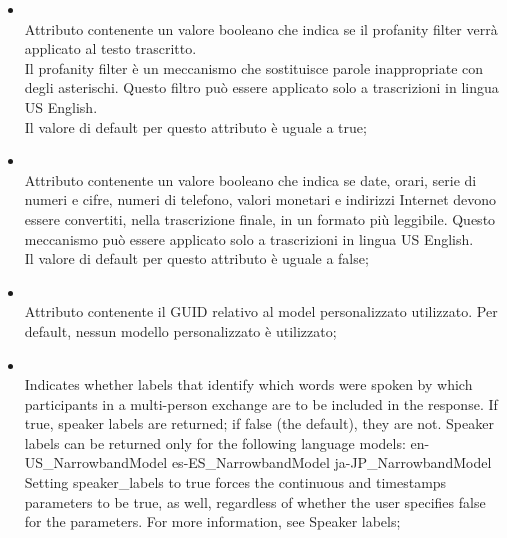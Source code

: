 \begin{itemize}
\begin{itemize}
		\item[]  \\
		Attributo contenente un valore booleano che indica se il profanity filter verrà applicato al testo trascritto. \\
Il profanity filter è un meccanismo che sostituisce parole inappropriate con degli asterischi. Questo filtro può essere applicato solo a trascrizioni in lingua US English. \\
Il valore di default per questo attributo è uguale a true;
		\item[]  \\
		Attributo contenente un valore booleano che indica se date, orari, serie di numeri e cifre, numeri di telefono, valori monetari e indirizzi Internet devono essere convertiti, nella trascrizione finale, in un formato più leggibile. Questo meccanismo può essere applicato solo a trascrizioni in lingua US English. \\
Il valore di default per questo attributo è uguale a false;
		\item[]  \\
		Attributo contenente il GUID relativo al model personalizzato utilizzato. Per default, nessun modello personalizzato è utilizzato;
		\item[]  \\
		Indicates whether labels that identify which words were spoken by which participants in a multi-person exchange are to be included in the response. If true, speaker labels are returned; if false (the default), they are not. Speaker labels can be returned only for the following language models:
en-US\_NarrowbandModel
es-ES\_NarrowbandModel
ja-JP\_NarrowbandModel
Setting speaker\_labels to true forces the continuous and timestamps parameters to be true, as well, regardless of whether the user specifies false for the parameters. For more information, see Speaker labels;
	\end{itemize}
\end{itemize}
\FloatBarrier

